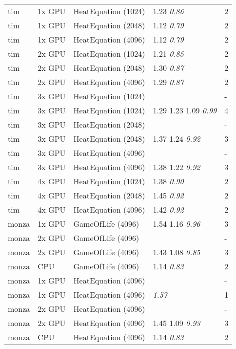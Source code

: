 \begin{table}
\begin{tabular}{| l | l | l | l | l |}
tim & 1x GPU & HeatEquation (1024) & 1.23 \textit{0.86} & 2 \\
tim & 1x GPU & HeatEquation (2048) & 1.12 \textit{0.79} & 2 \\
tim & 1x GPU & HeatEquation (4096) & 1.12 \textit{0.79} & 2 \\
tim & 2x GPU & HeatEquation (1024) & 1.21 \textit{0.85} & 2 \\
tim & 2x GPU & HeatEquation (2048) & 1.30 \textit{0.87} & 2 \\
tim & 2x GPU & HeatEquation (4096) & 1.29 \textit{0.87} & 2 \\
tim & 3x GPU & HeatEquation (1024) &  & - \\
tim & 3x GPU & HeatEquation (1024) & 1.29 1.23 1.09 \textit{0.99} & 4 \\
tim & 3x GPU & HeatEquation (2048) &  & - \\
tim & 3x GPU & HeatEquation (2048) & 1.37 1.24 \textit{0.92} & 3 \\
tim & 3x GPU & HeatEquation (4096) &  & - \\
tim & 3x GPU & HeatEquation (4096) & 1.38 1.22 \textit{0.92} & 3 \\
tim & 4x GPU & HeatEquation (1024) & 1.38 \textit{0.90} & 2 \\
tim & 4x GPU & HeatEquation (2048) & 1.45 \textit{0.92} & 2 \\
tim & 4x GPU & HeatEquation (4096) & 1.42 \textit{0.92} & 2 \\
monza & 1x GPU & GameOfLife (4096) & 1.54 1.16 \textit{0.96} & 3 \\
monza & 2x GPU & GameOfLife (4096) &  & - \\
monza & 2x GPU & GameOfLife (4096) & 1.43 1.08 \textit{0.85} & 3 \\
monza & CPU & GameOfLife (4096) & 1.14 \textit{0.83} & 2 \\
monza & 1x GPU & HeatEquation (4096) &  & - \\
monza & 1x GPU & HeatEquation (4096) & \textit{1.57} & 1 \\
monza & 2x GPU & HeatEquation (4096) &  & - \\
monza & 2x GPU & HeatEquation (4096) & 1.45 1.09 \textit{0.93} & 3 \\
monza & CPU & HeatEquation (4096) & 1.14 \textit{0.83} & 2 \\
\hline
\end{tabular}
\caption{}
\label{tab:breakeven}
\end{table}


